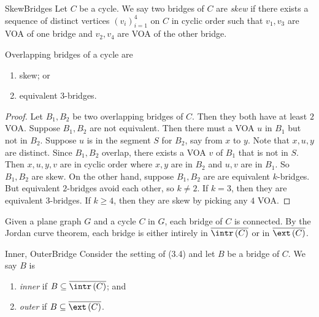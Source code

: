 \documentclass[co342]{subfiles}
\begin{document}
    \begin{definition}{Skew}{Bridges}
        Let $C$ be a cycle. We say two bridges of $C$ are \emph{skew} if there exists a sequence of distinct vertices $\left( v_{i} \right)^{4}_{i=1}$ on $C$ in cyclic order such that $v_1,v_3$ are VOA of one bridge and $v_2,v_4$ are VOA of the other bridge.
    \end{definition}
    
    \begin{prop}{}
        Overlapping bridges of a cycle are
        \begin{enumerate}
            \item skew; or
            \item equivalent $3$-bridges.
        \end{enumerate}
    \end{prop}

    \begin{proof}
        Let $B_1,B_2$ be two overlapping bridges of $C$. Then they both have at least $2$ VOA. Suppose $B_1,B_2$ are not equivalent. Then there must a VOA $u$ in $B_1$ but not in $B_2$. Suppose $u$ is in the segment $S$ for $B_2$, say from $x$ to $y$. Note that $x,u,y$ are distinct. Since $B_1,B_2$ overlap, there exists a VOA $v$ of $B_1$ that is not in $S$. Then $x,u,y,v$ are in cyclic order where $x,y$ are in $B_2$ and $u,v$ are in $B_1$. So $B_1,B_2$ are skew. On the other hand, suppose $B_1,B_2$ are are equivalent $k$-bridges. But equivalent $2$-bridges avoid each other, so $k\neq 2$. If $k=3$, then they are equivalent $3$-bridges. If $k\geq 4$, then they are skew by picking any $4$ VOA.
    \end{proof}

    \np Given a plane graph $G$ and a cycle $C$ in $G$, each bridge of $C$ is connected. By the Jordan curve theorem, each bridge is either intirely in $\overline{\intr\left( C \right)}$ or in $\overline{\ext\left( C \right)}$.

    \begin{definition}{Inner, Outer}{Bridge}
        Consider the setting of (3.4) and let $B$ be a bridge of $C$. We say $B$ is
        \begin{enumerate}
            \item \emph{inner} if $B\subseteq\overline{\intr\left( C \right)}$; and
            \item \emph{outer} if $B\subseteq\overline{\ext\left( C \right)}$.
        \end{enumerate}
    \end{definition}
\end{document}
